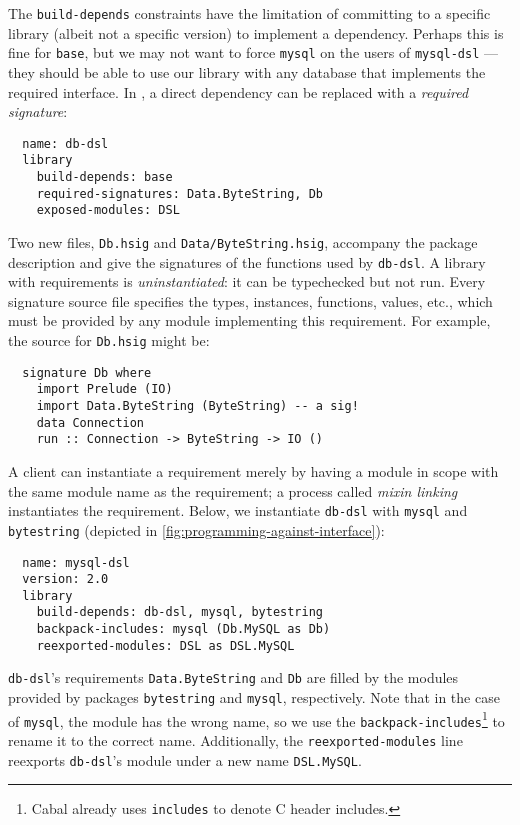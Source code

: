 

The \verb|build-depends|
constraints have the limitation of committing to a specific
library (albeit not a specific version) to implement a dependency.  Perhaps this is fine for
\verb|base|, but we may not want to force \verb|mysql| on the users of \verb|mysql-dsl|
---they should be able to use our library with any database that
implements the required interface.
In \Backpack{}, a direct dependency can be replaced with a
\emph{required signature}:

\begin{verbatim}
  name: db-dsl
  library
    build-depends: base
    required-signatures: Data.ByteString, Db
    exposed-modules: DSL
\end{verbatim}
Two new files, \verb|Db.hsig| and \verb|Data/ByteString.hsig|, accompany the package description and give
the signatures of the functions used by \verb|db-dsl|.
A library with requirements is \emph{uninstantiated}: it can be typechecked but not
run.  Every signature source file specifies the types, instances, functions, values, etc., which must be provided
by any module implementing this requirement.  For example, the source for
\verb|Db.hsig| might be:

\begin{verbatim}
  signature Db where
    import Prelude (IO)
    import Data.ByteString (ByteString) -- a sig!
    data Connection
    run :: Connection -> ByteString -> IO ()
\end{verbatim}
%
A client can instantiate a requirement merely by having a module
in scope with the same module name as the requirement; a process called \emph{mixin linking} instantiates the requirement.  Below, we instantiate \verb|db-dsl| with \verb|mysql| and
\verb|bytestring| (depicted in \cref{fig:programming-against-interface}):

\begin{verbatim}
  name: mysql-dsl
  version: 2.0
  library
    build-depends: db-dsl, mysql, bytestring
    backpack-includes: mysql (Db.MySQL as Db)
    reexported-modules: DSL as DSL.MySQL
\end{verbatim}
%
\verb|db-dsl|'s requirements \verb|Data.ByteString| and \verb|Db| are
filled by the modules provided by packages \verb|bytestring| and \verb|mysql|,
respectively.  Note that in the case of \verb|mysql|, the module has the wrong
name, so we use the \verb|backpack-includes|\footnote{Cabal already uses
\texttt{includes} to denote C header includes.} to rename it to the correct name.
Additionally, the \verb|reexported-modules| line
reexports \verb|db-dsl|'s module under a new name \verb|DSL.MySQL|.

